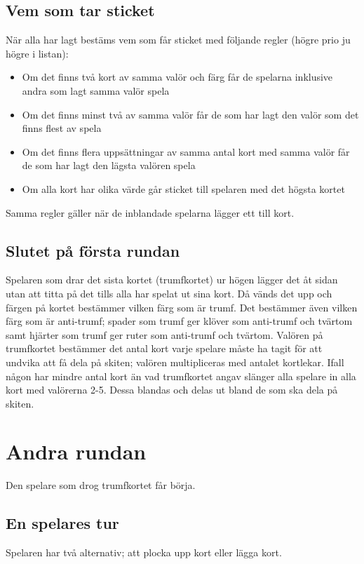 \documentclass[a4paper,12pt]{article}
\begin{document}
\subsection{Vem som tar sticket}
När alla har lagt bestäms vem som får sticket med följande regler (högre prio ju högre i listan):
\begin{itemize}
  \item Om det finns två kort av samma valör och färg får de spelarna inklusive andra som lagt samma valör spela
  \item Om det finns minst två av samma valör får de som har lagt den valör som det finns flest av spela
  \item Om det finns flera uppsättningar av samma antal kort med samma valör får de som har lagt den lägsta valören spela
  \item Om alla kort har olika värde går sticket till spelaren med det högsta kortet
\end{itemize}
Samma regler gäller när de inblandade spelarna lägger ett till kort.

\subsection{Slutet på första rundan}
Spelaren som drar det sista kortet (trumfkortet) ur högen lägger det åt sidan utan att titta på det tills alla har spelat ut sina kort. Då vänds det upp och färgen på kortet bestämmer vilken färg som är trumf. Det bestämmer även vilken färg som är anti-trumf; spader som trumf ger klöver som anti-trumf och tvärtom samt hjärter som trumf ger ruter som anti-trumf och tvärtom. Valören på trumfkortet bestämmer det antal kort varje spelare måste ha tagit för att undvika att få dela på skiten; valören multipliceras med antalet kortlekar. Ifall någon har mindre antal kort än vad trumfkortet angav slänger alla spelare in alla kort med valörerna 2-5. Dessa blandas och delas ut bland de som ska dela på skiten.

\section{Andra rundan}
Den spelare som drog trumfkortet får börja.

\subsection{En spelares tur}
Spelaren har två alternativ; att plocka upp kort eller lägga kort.
\end{document}
